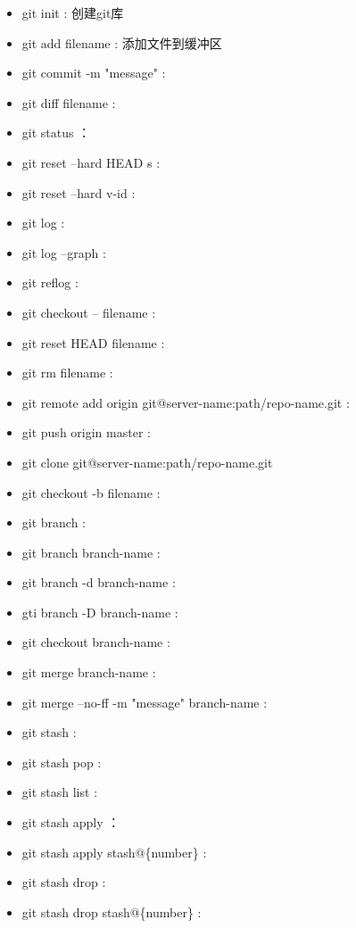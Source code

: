\documentclass[12pt,twoside]{report}
\begin{document}
\begin{leftbar}
    \begin{itemize}
        \item git init : 创建git库
        \item git add filename : 添加文件到缓冲区
        \item git commit -m "message" : 
        \item git diff filename :
        \item git status ：
        \item git reset --hard HEAD s$\hat{}$ :
        \item git reset --hard v-id :
        \item git log :
        \item git log --graph :
        \item git reflog :
        \item git checkout -- filename :
        \item git reset HEAD filename :
        \item git rm filename :
        \item git remote add origin git@server-name:path/repo-name.git : 
        \item git push origin master : 
        \item git clone git@server-name:path/repo-name.git
        \item git checkout -b filename :
        \item git branch :
        \item git branch branch-name :
        \item git branch -d branch-name :
        \item gti branch -D branch-name :
        \item git checkout branch-name :
        \item git merge branch-name :
        \item git merge --no-ff -m "message" branch-name :
        \item git stash :
        \item git stash pop :
        \item git stash list :
        \item git stash apply ：
        \item git stash apply stash@\{number\} :
        \item git stash drop :
        \item git stash drop stash@\{number\} :
    \end{itemize}
\end{leftbar}
\end{document}
